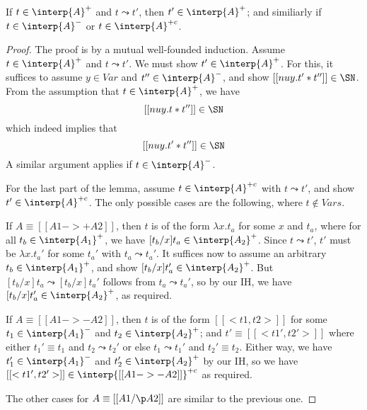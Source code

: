 \begin{lemma}
\label{lem:stepinterp}
If $t\in\interp{A}^+$ and $t\leadsto t'$, then
$t'\in\interp{A}^+$; and similiarly if $t\in\interp{A}^-$ or $t\in\interp{A}^{+c}$.
\end{lemma}
\begin{proof}
The proof is by a mutual well-founded induction.
Assume $t\in\interp{A}^+$ and $t\leadsto t'$.  We must show $t'\in\interp{A}^+$.
For this, it suffices to assume $y\in\textit{Var}$ and $t''\in\interp{A}^-$,
and show $[[nu y . t' * t'']]\in\SN$.  From the assumption that $t\in\interp{A}^+$,
we have 
\[
[[nu y . t * t'']] \in\SN
\]
which indeed implies that 
\[
[[nu y . t' * t'']] \in\SN
\]
A similar argument applies if $t\in\interp{A}^-$.  

For the last part of the lemma, assume $t\in\interp{A}^{+c}$ with
$t\leadsto t'$, and show $t'\in\interp{A}^{+c}$.  The only possible
cases are the following, where $t\not\in\textit{Vars}$.

If $A \equiv [[A1 ->+ A2]]$, then $t$ is of the form $\lambda x.t_a$
for some $x$ and $t_a$, where for all $t_b\in\interp{A_1}^+$, we have
$[t_b/x]t_a\in\interp{A_2}^+$.  Since $t\leadsto t'$, $t'$ must be
$\lambda x.t_a'$ for some $t_a'$ with $t_a\leadsto t_a'$.  It suffices
now to assume an arbitrary $t_b\in\interp{A_1}^+$, and show
$[t_b/x]t_a'\in\interp{A_2}^+$.  But $[t_b/x]t_a\leadsto [t_b/x]t_a'$
follows from $t_a\leadsto t_a'$, so by our IH, we have
$[t_b/x]t_a'\in\interp{A_2}^+$, as required.

If $A\equiv [[A1 ->- A2]]$, then $t$ is of the form $[[< t1 , t2 >]]$
for some $t_1\in\interp{A_1}^-$ and $t_2\in\interp{A_2}^+$; and
$t'\equiv [[< t1' , t2' >]]$ where either $t_1'\equiv t_1$ and $t_2\leadsto t_2'$
or else $t_1\leadsto t_1'$ and $t_2'\equiv t_2$.  Either way, we have
$t_1'\in\interp{A_1}^-$ and $t_2'\in\interp{A_2}^+$ by our IH, so
we have $[[< t1' , t2'>]]\in\interp{[[A1 ->- A2]]}^{+c}$ as required.

The other cases for $A\equiv [[A1 /\p A2]]$ are similar to the previous one.
\end{proof}

